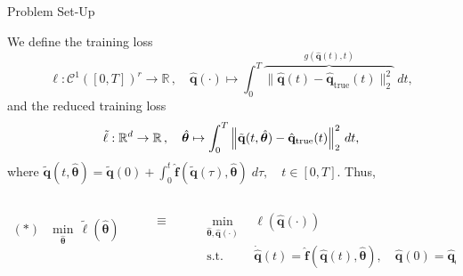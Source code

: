 \begin{frame}{Problem Set-Up}

We define the \textcolor{codeblue}{training loss} 
\vspace{-0.6cm}
\begin{equation*}
        \ell: \mathcal{C}^1([0,T])^r  \to \mathbb{R}\,,\quad \hat{\mathbf{q}}(\cdot) \mapsto  \int_0^T \overbrace{\Big\|\hat{\mathbf{q}}(t) - \hat{\mathbf{q}}_\mathrm{true}(t)\Big\|_2^2}^{g(\hat{\mathbf{q}}(t),t)}~dt,
        \label{eq:continuous_loss}
\end{equation*}
and the \textcolor{codeblue}{reduced training loss}
\begin{equation*}
        \tilde{\ell}: \mathbb{R}^d  \to \mathbb{R}\,,\quad \hat{\bm{\theta}} \mapsto \int_0^T \norm{\tilde{\mathbf{q}}(t,\hat{\bm{\theta}}) - \hat{\mathbf{q}}_\mathrm{true}(t)}_2^2~dt,
        \label{eq:continuous_reduced_loss}
    \end{equation*}
    where $\tilde{\mathbf{q}}(t, \hat{\bm{\theta}}) = \tilde{\mathbf{q}}(0) + \displaystyle\int_{0}^t \hat{\mathbf{f}}(\tilde{\mathbf{q}}(\tau),\hat{\bm{\theta}})\;d\tau, \quad t\in[0,T]$. Thus,

\begin{columns}[T]
\begin{column}{0.1\textwidth}
\begin{align*}
    ~&~\\
    \bm{(*)}\quad\underset{\hat{\bm{\theta}}}{\mathrm{min}}~~\tilde\ell (\hat{\bm{\theta}})
\end{align*}
\end{column}

\begin{column}{0.03\textwidth}
\begin{align*}
    ~&~\\
    \bm{\equiv}
\end{align*}
\end{column}

\begin{column}{0.4\textwidth}
\begin{align*}
    \underset{\hat{\bm{\theta}},\hat{\mathbf{q}}(\cdot)}{\mathrm{min}} ~~&\ell (\hat{\mathbf{q}}(\cdot))\\
    \mathrm{s.t.}~~&\dot{\hat{\mathbf{q}}}(t) = \hat{\mathbf{f}}(\hat{\mathbf{q}}(t),\hat{\bm{\theta}}), \quad\hat{\mathbf{q}}(0)=\hat{\mathbf{q}}_0
    \label{eq:opt_problem}
\end{align*}
\end{column}
\end{columns}

\end{frame}



